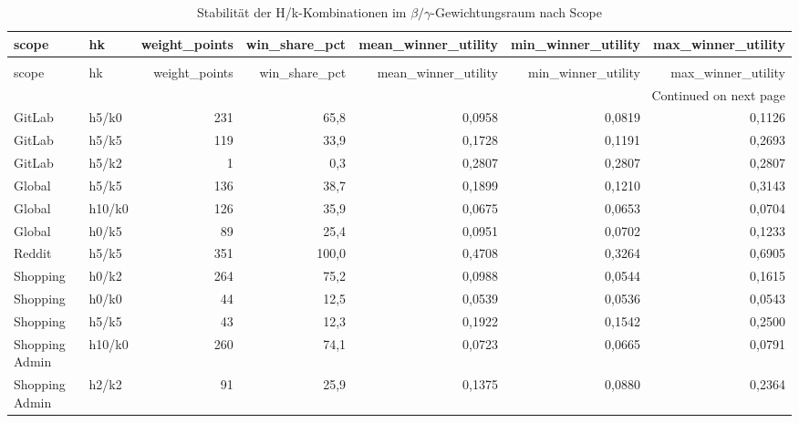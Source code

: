 \begin{longtable}{llrrrrr}
\caption{Stabilität der H/k-Kombinationen im \(\beta/\gamma\)-Gewichtungsraum nach Scope} \label{tab:weight-space-stability-by-scope} \\
\toprule
scope & hk & weight\_points & win\_share\_pct & mean\_winner\_utility & min\_winner\_utility & max\_winner\_utility \\
\midrule
\endfirsthead
\caption[]{Stabilität der H/k-Kombinationen im \(\beta/\gamma\)-Gewichtungsraum nach Scope} \\
\toprule
scope & hk & weight\_points & win\_share\_pct & mean\_winner\_utility & min\_winner\_utility & max\_winner\_utility \\
\midrule
\endhead
\midrule
\multicolumn{7}{r}{Continued on next page} \\
\midrule
\endfoot
\bottomrule
\endlastfoot
GitLab & h5/k0 & 231 & 65,8 & 0,0958 & 0,0819 & 0,1126 \\
GitLab & h5/k5 & 119 & 33,9 & 0,1728 & 0,1191 & 0,2693 \\
GitLab & h5/k2 & 1 & 0,3 & 0,2807 & 0,2807 & 0,2807 \\
Global & h5/k5 & 136 & 38,7 & 0,1899 & 0,1210 & 0,3143 \\
Global & h10/k0 & 126 & 35,9 & 0,0675 & 0,0653 & 0,0704 \\
Global & h0/k5 & 89 & 25,4 & 0,0951 & 0,0702 & 0,1233 \\
Reddit & h5/k5 & 351 & 100,0 & 0,4708 & 0,3264 & 0,6905 \\
Shopping & h0/k2 & 264 & 75,2 & 0,0988 & 0,0544 & 0,1615 \\
Shopping & h0/k0 & 44 & 12,5 & 0,0539 & 0,0536 & 0,0543 \\
Shopping & h5/k5 & 43 & 12,3 & 0,1922 & 0,1542 & 0,2500 \\
Shopping Admin & h10/k0 & 260 & 74,1 & 0,0723 & 0,0665 & 0,0791 \\
Shopping Admin & h2/k2 & 91 & 25,9 & 0,1375 & 0,0880 & 0,2364 \\
\end{longtable}
